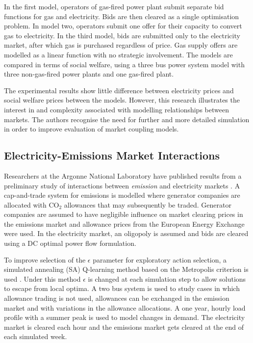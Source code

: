 In the first model, operators of gas-fired power plant submit separate bid
functions for gas and electricity.  Bids are then cleared as a single
optimisation problem.  In model two, operators submit one offer for their
capacity to convert gas to electricity.  In the third model, bids are
submitted only to the electricity market, after which gas is purchased
regardless of price.  Gas supply offers are modelled as a linear function with
no strategic involvement.  The models are compared in terms of social welfare,
using a three bus power system model with three non-gas-fired power plants and
one gas-fired plant.

The experimental results show little difference between electricity prices and
social welfare prices between the models.  However, this research illustrates
the interest in and complexity associated with modelling relationships between
markets.  The authors recognise the need for further and more detailed
simulation in order to improve evaluation of market coupling models.

\subsection{Electricity-Emissions Market Interactions}
Researchers at the Argonne National Laboratory have published results from a
preliminary study of interactions between \textit{emission} and electricity
markets \cite{wang:09}.  A cap-and-trade system for emissions is modelled where
generator companies are allocated with $\mbox{CO}_2$ allowances that may
subsequently be traded.  Generator companies are assumed to have negligible
influence on market clearing prices in the emissions market and allowance
prices from the European Energy Exchange were used.  In the electricity market,
an oligopoly is assumed and bids are cleared using a DC optimal power flow
formulation.

To improve selection of the $\epsilon$ parameter for exploratory
action selection, a simulated annealing (SA) Q-learning method based on the
Metropolis criterion is used \cite{guo:sa}. Under this method $\epsilon$ is
changed at each simulation step to allow solutions to escape from local
optima.  A two bus system is used to study cases in which allowance trading
is not used, allowances can be exchanged in the emission market and with
variations in the allowance allocations.  A one year, hourly load profile with
a summer peak is used to model changes in demand.  The electricity market is
cleared each hour and the emissions market gets cleared at the end of each
simulated week.

